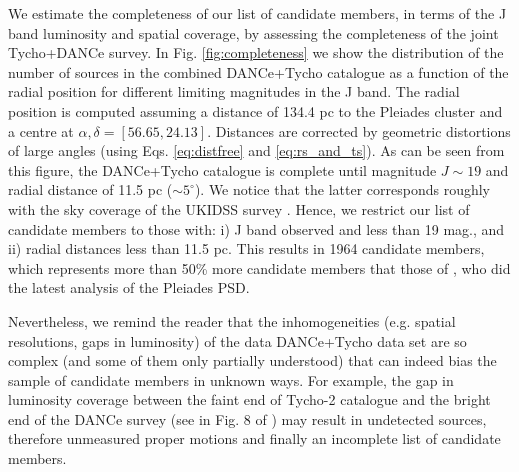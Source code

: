 We estimate the completeness of our list of candidate members, in terms of the J band luminosity and
spatial coverage, by assessing the completeness of the joint Tycho+DANCe survey. In Fig. \ref{fig:completeness} we show the distribution of the number of sources in the combined DANCe+Tycho catalogue as a function of the radial position for different limiting magnitudes in the J band.
The radial position is computed assuming a distance of 134.4 pc to the Pleiades cluster \citep{Galli2017} and a centre at $\alpha,\delta =[56.65,24.13]$. Distances are corrected by geometric distortions of large angles (using Eqs. \ref{eq:distfree} and \ref{eq:rs_and_ts}).
As can be seen from this figure, the DANCe+Tycho catalogue is complete until magnitude $J\sim19$ and radial distance of 11.5 pc ($\sim5^\circ$). We notice that the latter corresponds roughly with the sky coverage of the UKIDSS survey \citep{2007MNRAS.379.1599L}.
Hence, we restrict our list of candidate members to those with: i) J band observed and less than 19 mag., and ii) radial distances less than 11.5 pc. This results in 1964 candidate members, which represents more than 50\% more candidate members that those of  \citet{Converse2010}, who did the latest analysis of the Pleiades PSD.

Nevertheless, we remind the reader that the inhomogeneities (e.g. spatial resolutions, gaps in luminosity) of the data DANCe+Tycho data set are so complex (and some of them only partially understood) that can indeed bias the sample of candidate members in unknown ways. For example, the gap in luminosity coverage between the faint end of Tycho-2 catalogue and the bright end of the DANCe survey (see in Fig. 8 of \citealt{Bouy2015}) may result in undetected sources, therefore unmeasured proper motions and finally an incomplete list of candidate members.


